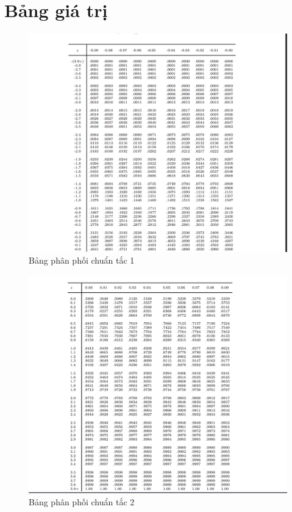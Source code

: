 \documentclass[12pt]{article}
\begin{document}
\section {Bảng giá trị}
\begin{figure}[ht]
    \centering
    \includegraphics[width=1.3\textwidth]{nd1.png}
    \caption{Bảng phân phối chuẩn tắc 1}
    \label{fig:nd1}
\end{figure}

\begin{figure}[ht]
    \centering
    \includegraphics[width=1.3\textwidth]{nd2.png}
    \caption{Bảng phân phối chuẩn tắc 2}
    \label{fig:nd2}
\end{figure}
\end{document}
